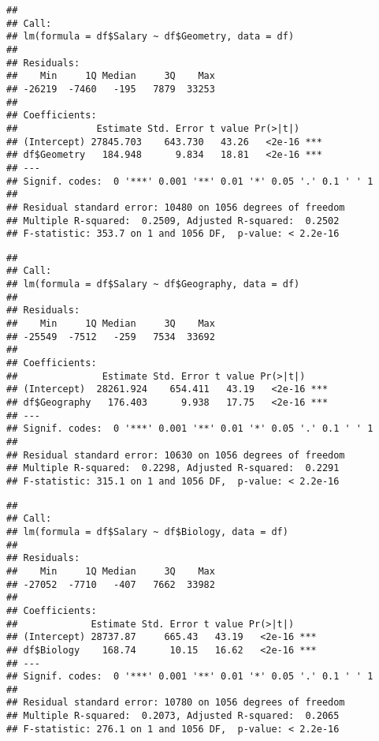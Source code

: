 \documentclass[
]{article}
\newenvironment{Shaded}{\begin{snugshade}}{\end{snugshade}}
\newcommand{\AttributeTok}[1]{\textcolor[rgb]{0.77,0.63,0.00}{#1}}
\newcommand{\FunctionTok}[1]{\textcolor[rgb]{0.00,0.00,0.00}{#1}}
\newcommand{\NormalTok}[1]{#1}
\newcommand{\SpecialCharTok}[1]{\textcolor[rgb]{0.00,0.00,0.00}{#1}}
\begin{document}
\begin{verbatim}
## 
## Call:
## lm(formula = df$Salary ~ df$Geometry, data = df)
## 
## Residuals:
##    Min     1Q Median     3Q    Max 
## -26219  -7460   -195   7879  33253 
## 
## Coefficients:
##              Estimate Std. Error t value Pr(>|t|)    
## (Intercept) 27845.703    643.730   43.26   <2e-16 ***
## df$Geometry   184.948      9.834   18.81   <2e-16 ***
## ---
## Signif. codes:  0 '***' 0.001 '**' 0.01 '*' 0.05 '.' 0.1 ' ' 1
## 
## Residual standard error: 10480 on 1056 degrees of freedom
## Multiple R-squared:  0.2509, Adjusted R-squared:  0.2502 
## F-statistic: 353.7 on 1 and 1056 DF,  p-value: < 2.2e-16
\end{verbatim}

\begin{Shaded}
\end{Shaded}

\begin{verbatim}
## 
## Call:
## lm(formula = df$Salary ~ df$Geography, data = df)
## 
## Residuals:
##    Min     1Q Median     3Q    Max 
## -25549  -7512   -259   7534  33692 
## 
## Coefficients:
##               Estimate Std. Error t value Pr(>|t|)    
## (Intercept)  28261.924    654.411   43.19   <2e-16 ***
## df$Geography   176.403      9.938   17.75   <2e-16 ***
## ---
## Signif. codes:  0 '***' 0.001 '**' 0.01 '*' 0.05 '.' 0.1 ' ' 1
## 
## Residual standard error: 10630 on 1056 degrees of freedom
## Multiple R-squared:  0.2298, Adjusted R-squared:  0.2291 
## F-statistic: 315.1 on 1 and 1056 DF,  p-value: < 2.2e-16
\end{verbatim}

\begin{Shaded}
\end{Shaded}

\begin{verbatim}
## 
## Call:
## lm(formula = df$Salary ~ df$Biology, data = df)
## 
## Residuals:
##    Min     1Q Median     3Q    Max 
## -27052  -7710   -407   7662  33982 
## 
## Coefficients:
##             Estimate Std. Error t value Pr(>|t|)    
## (Intercept) 28737.87     665.43   43.19   <2e-16 ***
## df$Biology    168.74      10.15   16.62   <2e-16 ***
## ---
## Signif. codes:  0 '***' 0.001 '**' 0.01 '*' 0.05 '.' 0.1 ' ' 1
## 
## Residual standard error: 10780 on 1056 degrees of freedom
## Multiple R-squared:  0.2073, Adjusted R-squared:  0.2065 
## F-statistic: 276.1 on 1 and 1056 DF,  p-value: < 2.2e-16
\end{verbatim}
\end{document}
